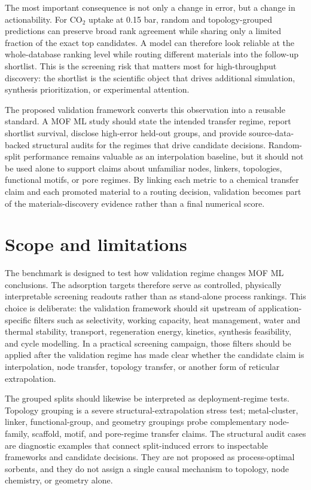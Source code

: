 \documentclass[11pt,a4paper]{article}
\begin{document}
The most important consequence is not only a change in error, but a change in actionability. For CO$_2$ uptake at 0.15 bar, random and topology-grouped predictions can preserve broad rank agreement while sharing only a limited fraction of the exact top candidates. A model can therefore look reliable at the whole-database ranking level while routing different materials into the follow-up shortlist.
This is the screening risk that matters most for high-throughput discovery: the shortlist is the scientific object that drives additional simulation, synthesis prioritization, or experimental attention.

The proposed validation framework converts this observation into a reusable standard. A MOF ML study should state the intended transfer regime, report shortlist survival, disclose high-error held-out groups, and provide source-data-backed structural audits for the regimes that drive candidate decisions. Random-split performance remains valuable as an interpolation baseline, but it should not be used alone to support claims about unfamiliar nodes, linkers, topologies, functional motifs, or pore regimes. By linking each metric to a chemical transfer claim and each promoted material to a routing decision, validation becomes part of the materials-discovery evidence rather than a final numerical score.


\section*{Scope and limitations}
The benchmark is designed to test how validation regime changes MOF ML conclusions. The adsorption targets therefore serve as controlled, physically interpretable screening readouts rather than as stand-alone process rankings. This choice is deliberate: the validation framework should sit upstream of application-specific filters such as selectivity, working capacity, heat management, water and thermal stability, transport, regeneration energy, kinetics, synthesis feasibility, and cycle modelling. In a practical screening campaign, those filters should be applied after the validation regime has made clear whether the candidate claim is interpolation, node transfer, topology transfer, or another form of reticular extrapolation.

The grouped splits should likewise be interpreted as deployment-regime tests. Topology grouping is a severe structural-extrapolation stress test; metal-cluster, linker, functional-group, and geometry groupings probe complementary node-family, scaffold, motif, and pore-regime transfer claims. The structural audit cases are diagnostic examples that connect split-induced errors to inspectable frameworks and candidate decisions. They are not proposed as process-optimal sorbents, and they do not assign a single causal mechanism to topology, node chemistry, or geometry alone.
\end{document}
